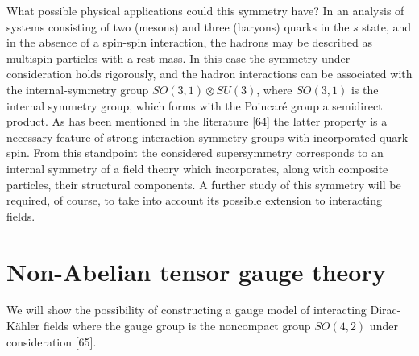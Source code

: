 \documentclass[a4paper,12pt]{article}
\begin{document}
What possible physical applications could this symmetry have? In
an analysis of systems consisting of two (mesons) and three
(baryons) quarks in the $s$ state, and in the absence of a
spin-spin interaction, the hadrons may be described as multispin
particles with a rest mass. In this case the symmetry under
consideration holds rigorously, and the hadron interactions can be
associated with the internal-symmetry group $SO(3,1)\otimes
SU(3)$, where $ SO(3,1)$ is the internal symmetry group, which
forms with the Poincar\'e group a semidirect product. As has been
mentioned in the literature [64] the latter property is a
necessary feature of strong-interaction symmetry groups with
incorporated quark spin. From this standpoint the considered
supersymmetry corresponds to an internal symmetry of a field
theory which incorporates, along with composite particles, their
structural components. A further study of this symmetry will be
required, of course, to take into account its possible extension
to interacting fields.

\section{Non-Abelian tensor gauge theory}

We will show the possibility of constructing a gauge model of interacting
Dirac-K\"ahler fields where the gauge group is the noncompact group $SO(4,2)$
under consideration [65].
\end{document}
